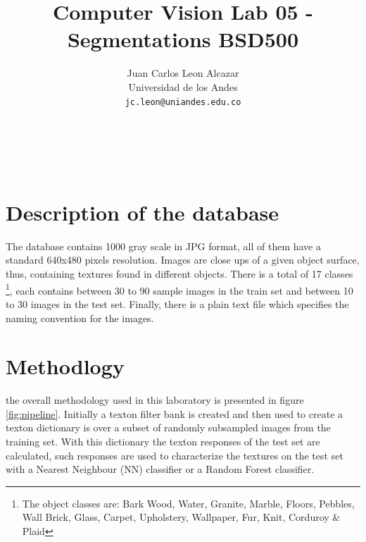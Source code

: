 \documentclass[10pt,twocolumn,letterpaper]{article}
\begin{document}
\title{Computer Vision Lab 05 -Segmentations BSD500}

\author{Juan Carlos Leon Alcazar\\
Universidad de los Andes\\
{\tt\small jc.leon@uniandes.edu.co}
\and
\\
\\
\\
{\tt\small }
}

\maketitle


\section{Description of the database}

The database\cite{Lazebnik2005} contains 1000 gray scale in JPG format, all of them have a standard 640x480 pixels resolution. Images are close ups of a given object surface, thus, containing textures found in different objects. There is a total of 17 classes \footnote{The object classes are: Bark Wood, Water, Granite, Marble, Floors, Pebbles, Wall Brick, Glass, Carpet, Upholstery, Wallpaper, Fur, Knit, Corduroy \& Plaid }, each contains between 30 to 90 sample images in the train set and between 10 to 30 images in the test set. Finally, there is a plain text file which specifies the naming convention for the images.


\section{Methodlogy}

the overall methodology used in this laboratory is presented in figure \ref{fig:pipeline}. Initially a texton filter bank is created and then used to create a texton dictionary is over a subset of randomly subsampled images from the training set. With this dictionary the texton responses of the test set are calculated, such responses are used to characterize the textures on the test set with a Nearest Neighbour (NN) classifier or a Random Forest classifier.
\end{document}
